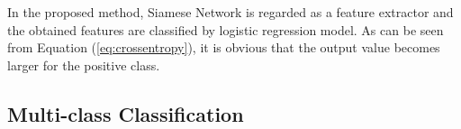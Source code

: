 \documentclass[runningheads,a4paper]{llncs}
\begin{document}
In the proposed method, Siamese Network is regarded as a feature extractor and the obtained features are classified by logistic regression model.
As can be seen from Equation (\ref{eq:crossentropy}), it is obvious that the output value becomes larger for the positive class.

\subsection{Multi-class Classification}
\end{document}
